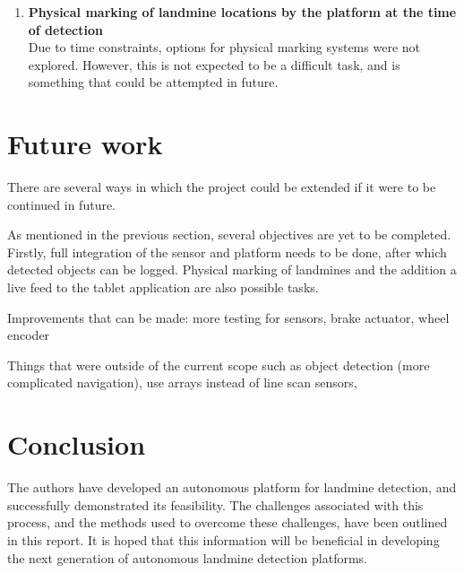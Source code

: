 \documentclass[main.tex]{subfiles}
\begin{document}
\begin{enumerate}
\item \textbf{Physical marking of landmine locations by the platform at the time of detection}\\ 
Due to time constraints, options for physical marking systems were not explored. However, this is not expected to be a difficult task, and is something that could be attempted in future.  
\end{enumerate}

\section{Future work}
There are several ways in which the project could be extended if it were to be continued in future. 

As mentioned in the previous section, several objectives are yet to be completed. Firstly, full integration of the sensor and platform needs to be done, after which detected objects can be logged. Physical marking of landmines and the addition a live feed to the tablet application are also possible tasks.

Improvements that can be made: more testing for sensors, brake actuator, wheel encoder

Things that were outside of the current scope such as object detection (more complicated navigation), use arrays instead of line scan sensors, 

\section{Conclusion}
The authors have developed an autonomous platform for landmine detection, and successfully demonstrated its feasibility. The challenges associated with this process, and the methods used to overcome these challenges, have been outlined in this report. It is hoped that this information will be beneficial in developing the next generation of autonomous landmine detection platforms.  
\end{document}
